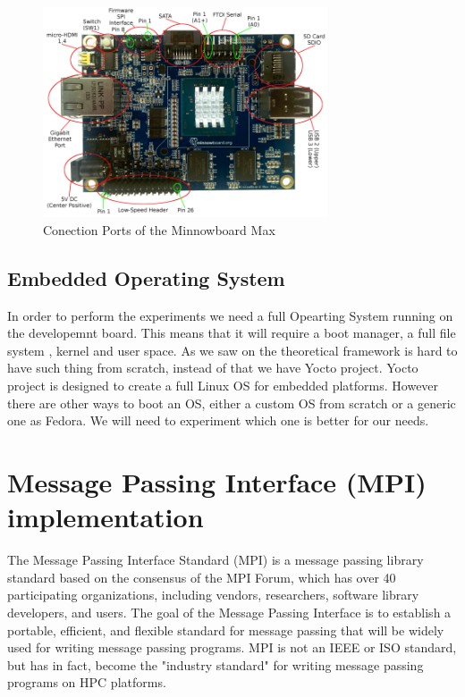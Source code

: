 \begin{figure}[H]
\centering
\includegraphics[width=0.75\textwidth]{images/minnow-max-2.png}
\caption{Conection Ports of the Minnowboard Max}
\label{fig:4.2}
\end{figure}

\subsection{Embedded Operating System} 

In order to perform the experiments we need a full Opearting System running on
the developemnt board. This means that it will require a boot manager, a full
file system , kernel and user space.  As we saw on the theoretical framework is
hard to have such thing from scratch, instead of that we have Yocto project.
Yocto project is designed to create a full Linux OS for embedded platforms.
However there are other ways to boot an OS, either a custom OS from scratch or
a generic one as Fedora. We will need to experiment which one is better for our
needs.

\section{Message Passing Interface (MPI) implementation}
\noindent

The Message Passing Interface Standard (MPI) is a message passing library
standard based on the consensus of the MPI Forum, which has over 40
participating organizations, including vendors, researchers, software library
developers, and users. The goal of the Message Passing Interface is to
establish a portable, efficient, and flexible standard for message passing
that will be widely used for writing message passing programs. MPI is not an IEEE
or ISO standard, but has in fact, become the "industry standard" for writing
message passing programs on HPC platforms. 

